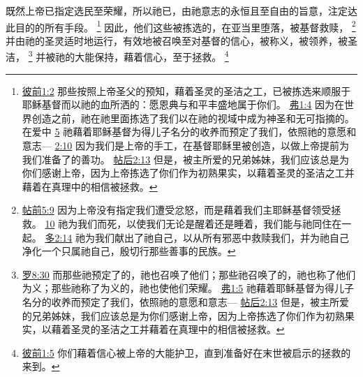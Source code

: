 \documentclass[12pt, a4paper, oneside]{ctexart}
\newcounter{parnum}[section]
\newcommand{\N}{%
   \noindent\refstepcounter{parnum}%
    \makebox[\parindent][l]{\textbf{\arabic{parnum}.}}}
\begin{document}
	
\N 既然上帝已指定选民至荣耀，所以祂已，由祂意志的永恒且至自由的旨意，注定达此目的的所有手段。
	\footnote {
		\href{https://biblehub.com/1_peter/1-2.htm}{彼前1:2} 那些按照上帝圣父的预知，藉着圣灵的圣洁之工，已被拣选来顺服于耶稣基督而以祂的血所洒的：愿恩典与和平丰盛地属于你们。
		\href{https://biblehub.com/ephesians/1-4.htm}{弗1:4} 因为在世界创造之前，祂在祂里面拣选了我们以在祂的视域中成为神圣和无可指摘的。在爱中
		\href{https://biblehub.com/ephesians/1-5.htm}{5} 祂藉着耶稣基督为得儿子名分的收养而预定了我们，依照祂的意愿和意志---
		\href{https://biblehub.com/ephesians/2-10.htm}{2:10} 因为我们是上帝的手工，在基督耶稣里被创造，以做上帝提前为我们准备了的善功。
		\href{https://biblehub.com/2_thessalonians/2-13.htm}{帖后2:13} 但是，被主所爱的兄弟姊妹，我们应该总是为你们感谢上帝，因为上帝拣选了你们作为初熟果实，以藉着圣灵的圣洁之工并藉着在真理中的相信被拯救。
	}
	因此，他们这些被拣选的，在亚当里堕落，被基督救赎，
	\footnote {
		\href{https://biblehub.com/1_thessalonians/5-9.htm}{帖前5:9} 因为上帝没有指定我们遭受忿怒，而是藉着我们主耶稣基督领受拯救。
		\href{https://biblehub.com/1_thessalonians/5-10.htm}{10} 祂为我们而死，以使我们无论是醒着还是睡着，我们能与祂同住在一起。
		\href{https://biblehub.com/titus/2-14.htm}{多2:14} 祂为我们献出了祂自己，以从所有邪恶中救赎我们，并为祂自己净化一个只属祂自己，殷切行那些善事的民族。
	}
	并由祂的圣灵适时地运行，有效地被召唤至对基督的信心，被称义，被领养，被圣洁，
	\footnote {
		\href{https://biblehub.com/romans/8-30.htm}{罗8:30} 而那些祂预定了的，祂也召唤了他们；那些祂召唤了的，祂也称了他们为义；那些祂称了为义的，祂也使他们荣耀。
		\href{https://biblehub.com/ephesians/1-5.htm}{弗1:5} 祂藉着耶稣基督为得儿子名分的收养而预定了我们，依照祂的意愿和意志---
		\href{https://biblehub.com/2_thessalonians/2-13.htm}{帖后2:13} 但是，被主所爱的兄弟姊妹，我们应该总是为你们感谢上帝，因为上帝拣选了你们作为初熟果实，以藉着圣灵的圣洁之工并藉着在真理中的相信被拯救。
	}
	并被祂的大能保持，藉着信心，至于拯救。
	\footnote {
		\href{https://biblehub.com/1_peter/1-5.htm}{彼前1:5} 你们藉着信心被上帝的大能护卫，直到准备好在末世被启示的拯救的来到。
	}
\end{document}
